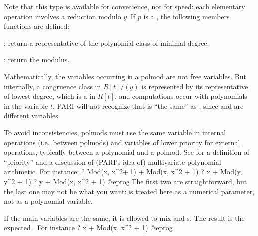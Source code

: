 Note that this type is available for convenience, not for speed: each
elementary operation involves a reduction modulo $y$.
If $p$ is a , the following members functions are defined:

: return a representative of the polynomial class of minimal degree.

: return the modulus.

\label{se:rempolmod}
Mathematically, the variables occurring in a polmod are not
free variables. But internally, a congruence class in $R[t]/(y)$ is
represented by its representative  of lowest degree, which is a  in
$R[t]$, and computations occur with polynomials in the variable $t$. PARI
will not recognize that  is ``the same'' as
, since  and  are different variables.

To avoid inconsistencies, polmods must use the same variable in internal
operations (i.e.~between polmods) and variables of lower priority for
external operations, typically between a polynomial and a polmod. See
 for a definition of ``priority'' and a discussion of
(PARI's idea of) multivariate polynomial arithmetic.
For instance:
\bprog
    ? Mod(x, x^2+ 1) + Mod(x, x^2 + 1)
    ? x + Mod(y, y^2 + 1)
    ? y + Mod(x, x^2 + 1)
@eprog\noindent
The first two are straightforward, but the last one may not be what you
want:  is treated here as a numerical parameter, not as a polynomial
variable.

If the main variables are the same, it is allowed to mix  and
s. The result is the expected . For instance
\bprog
    ? x + Mod(x, x^2 + 1)
@eprog

